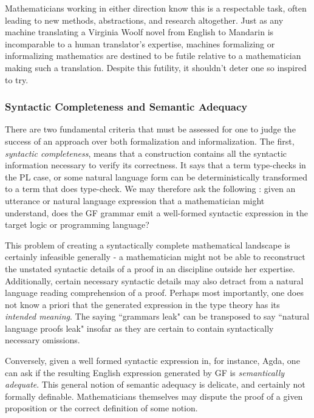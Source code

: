 Mathematicians working in either direction know this is a respectable task,
often leading to new methods, abstractions, and research altogether. Just as any
machine translating a Virginia Woolf novel from English to Mandarin is
incomparable to a human translator's expertise, machines formalizing or
informalizing mathematics are destined to be futile relative to a mathematician
making such a translation. Despite this futility, it shouldn't deter one so 
inspired to try.

\subsubsection{Syntactic Completeness and Semantic Adequacy}

There are two fundamental criteria that must be assessed for one to judge the
success of an approach over both formalization and informalization. The first,
\emph{syntactic completeness}, means that a construction contains all the
syntactic information necessary to verify its correctness. It says that a term
type-checks in the PL case, or some natural language form can be
deterministically transformed to a term that does type-check. We may therefore
ask the following : given an utterance or natural language expression that a
mathematician might understand, does the GF grammar emit a well-formed syntactic
expression in the target logic or programming language?

This problem of creating a syntactically complete mathematical landscape is
certainly infeasible generally - a mathematician might not be able to
reconstruct the unstated syntactic details of a proof in an discipline outside
her expertise. Additionally, certain necessary syntactic details may also
detract from a natural language reading comprehension of a proof. Perhaps most
importantly, one does not know a priori that the generated expression in the
type theory has its \emph{intended meaning}. The saying ``grammars leak" can be
transposed to say ``natural language proofs leak" insofar as they are certain to
contain syntactically necessary omissions.

Conversely, given a well formed syntactic expression in, for instance, Agda, one
can ask if the resulting English expression generated by GF is
\emph{semantically adequate}. This general notion of semantic adequacy is
delicate, and certainly not formally definable. Mathematicians themselves may
dispute the proof of a given proposition or the correct definition of some
notion.

